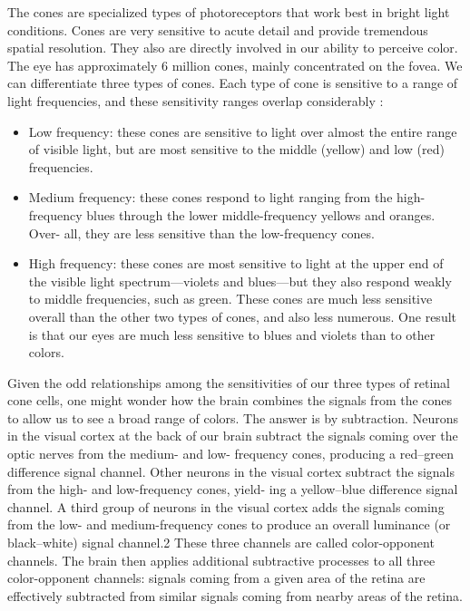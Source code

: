 \documentclass[
]{book}
\providecommand{\tightlist}{%
  \setlength{\itemsep}{0pt}\setlength{\parskip}{0pt}}
\begin{document}
The cones are specialized types of photoreceptors that work best in bright light conditions. Cones are very sensitive to acute detail and provide tremendous spatial resolution. They also are directly involved in our ability to perceive color. The eye has approximately 6 million cones, mainly concentrated on the fovea. We can differentiate three types of cones. Each type of cone is sensitive to a range of light frequencies, and these sensitivity ranges overlap considerably \citep{Johnson2014designingwiththemind}:

\begin{itemize}
\tightlist
\item
  Low frequency: these cones are sensitive to light over almost the entire range of visible light, but are most sensitive to the middle (yellow) and low (red) frequencies.
\item
  Medium frequency: these cones respond to light ranging from the high-frequency blues through the lower middle-frequency yellows and oranges. Over- all, they are less sensitive than the low-frequency cones.
\item
  High frequency: these cones are most sensitive to light at the upper end of the visible light spectrum---violets and blues---but they also respond weakly to middle frequencies, such as green. These cones are much less sensitive overall than the other two types of cones, and also less numerous. One result is that our eyes are much less sensitive to blues and violets than to other colors.
\end{itemize}

Given the odd relationships among the sensitivities of our three types of retinal cone cells, one might wonder how the brain combines the signals from the cones to allow us to see a broad range of colors.
The answer is by subtraction. Neurons in the visual cortex at the back of our brain subtract the signals coming over the optic nerves from the medium- and low- frequency cones, producing a red--green difference signal channel. Other neurons in the visual cortex subtract the signals from the high- and low-frequency cones, yield- ing a yellow--blue difference signal channel. A third group of neurons in the visual cortex adds the signals coming from the low- and medium-frequency cones to produce an overall luminance (or black--white) signal channel.2 These three channels are called color-opponent channels.
The brain then applies additional subtractive processes to all three color-opponent channels: signals coming from a given area of the retina are effectively subtracted from similar signals coming from nearby areas of the retina.
\end{document}
